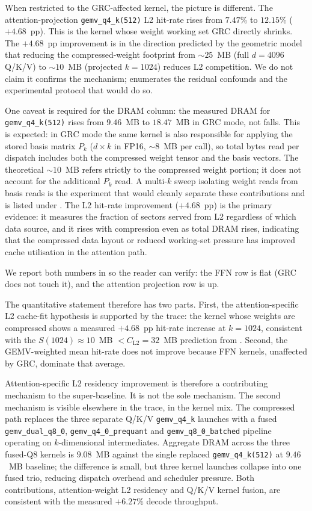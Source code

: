 \documentclass[11pt]{article}
\begin{document}
When restricted to the GRC-affected kernel, the picture is different. The
attention-projection \texttt{gemv\_q4\_k(512)} L2 hit-rate rises from $7.47\%$
to $12.15\%$ ($+4.68$~pp). This is the kernel whose weight working set GRC
directly shrinks. The $+4.68$~pp improvement is in the direction predicted
by the geometric model that reducing the compressed-weight footprint from
${\sim}25$~MB (full $d{=}4096$ Q/K/V) to ${\sim}10$~MB (projected
$k{=}1024$) reduces L2 competition. We do not claim it confirms the
mechanism;  enumerates the residual confounds
and the experimental protocol that would do so.

One caveat is required for the DRAM column: the measured DRAM for
\texttt{gemv\_q4\_k(512)} rises from $9.46$~MB to $18.47$~MB in GRC mode,
not falls. This is expected: in GRC mode the same kernel is also responsible
for applying the stored basis matrix $P_k$ ($d{\times}k$ in FP16, ${\sim}8$~MB
per call), so total bytes read per dispatch includes both the compressed
weight tensor and the basis vectors. The theoretical ${\sim}10$~MB refers
strictly to the compressed weight portion; it does not account for the
additional $P_k$ read. A multi-$k$ sweep isolating weight reads from basis
reads is the experiment that would cleanly separate these contributions and
is listed under . The L2 hit-rate improvement ($+4.68$~pp)
is the primary evidence: it measures the fraction of sectors served from L2
regardless of which data source, and it rises with compression even as total
DRAM rises, indicating that the compressed data layout or reduced working-set
pressure has improved cache utilisation in the attention path.

We report both numbers in  so the
reader can verify: the FFN row is flat (GRC does not touch it), and the
attention projection row is up.

The quantitative statement therefore has two parts. First, the
attention-specific L2 cache-fit hypothesis is supported by the trace:
the kernel whose weights are compressed shows a measured $+4.68$~pp
hit-rate increase at $k{=}1024$, consistent with the $S(1024)\approx 10$~MB
$< C_\text{L2} = 32$~MB prediction from . Second, the
GEMV-weighted mean hit-rate does not improve because FFN kernels, unaffected
by GRC, dominate that average.

Attention-specific L2 residency improvement is therefore a contributing
mechanism to the super-baseline. It is not the sole mechanism. The second
mechanism is visible elsewhere in the trace, in the kernel mix. The
compressed path replaces the three separate Q/K/V \texttt{gemv\_q4\_k}
launches with a fused \texttt{gemv\_dual\_q8\_0}, \texttt{gemv\_q4\_0\_prequant}
and \texttt{gemv\_q8\_0\_batched} pipeline operating on $k$-dimensional
intermediates. Aggregate DRAM across the three fused-Q8 kernels is $9.08$~MB
against the single replaced \texttt{gemv\_q4\_k(512)} at $9.46$~MB baseline;
the difference is small, but three kernel launches collapse into one fused
trio, reducing dispatch overhead and scheduler pressure. Both contributions,
attention-weight L2 residency and Q/K/V kernel fusion, are consistent with
the measured $+6.27\%$ decode throughput.
\end{document}
